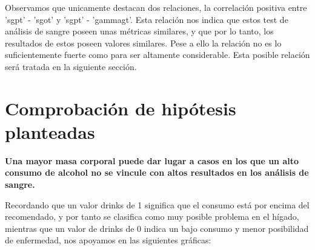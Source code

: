 Observamos que unicamente destacan dos relaciones, la correlación positiva entre 'sgpt' - 'sgot' y  'sgpt' - 'gammagt'. Esta relación nos indica que estos test de análisis de sangre poseen unas métricas similares, y que por lo tanto, los resultados de estos poseen valores similares. Pese a ello la relación no es lo suficientemente fuerte como para ser altamente considerable. Esta posible relación será tratada en la siguiente sección.







\newpage
\section{Comprobación de hipótesis planteadas}
\textbf{Una mayor masa corporal puede dar lugar a casos en los que un alto consumo de alcohol no se vincule con altos resultados en los análisis de sangre.}
	 
Recordando que un valor drinks de 1 significa que el consumo está por encima del recomendado, y por tanto se clasifica como muy posible problema en el hígado, mientras que un valor de drinks de 0 indica un bajo consumo y menor posibilidad de enfermedad, nos apoyamos en las siguientes gráficas:


